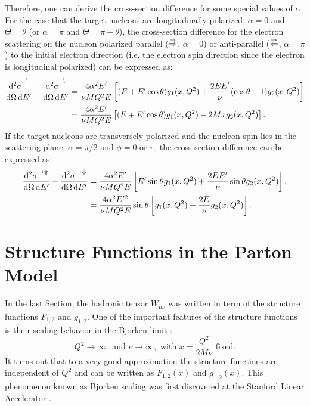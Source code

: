 Therefore, one can derive the cross-section difference for some special values of $\alpha$. For the case that the target nucleons are longitudinally polarized, $\alpha=0$ and $\Theta=\theta$ (or $\alpha=\pi$ and $\Theta=\pi-\theta$), the cross-section difference for the electron scattering on the nucleon polarized parallel ($\buildrel\rightarrow\over\Rightarrow$, $\alpha=0$) or anti-parallel ($\buildrel\rightarrow\over\Leftarrow$, $\alpha=\pi$) to the initial electron direction (i.e. the electron spin direction since the electron is longitudinal polarized) can be expressed as:
\begin{align}
\frac{\dd[2]{\sigma}^{\buildrel\rightarrow\over\Leftarrow}}{\dd{\Omega}\dd{E'}}-\frac{\dd[2]{\sigma}^{\buildrel\rightarrow\over\Rightarrow}}{\dd{\Omega}\dd{E'}} & = \frac{4\alpha^2E'}{\nu MQ^2E}\left[(E+E'\cos\theta)g_1(x,Q^2)+\frac{2EE'}{\nu}(\cos\theta-1)g_2(x,Q^2)\right] \notag \\ \label{C2S2E25}
& =\frac{4\alpha^2E'}{\nu MQ^2E}\left[(E+E'\cos\theta)g_1(x,Q^2)-2Mxg_2(x,Q^2)\right].
\end{align}
If the target nucleons are transversely polarized and the nucleon spin lies in the scattering plane, $\alpha=\pi/2$ and $\phi=0$ or $\pi$, the cross-section difference can be expressed as:
\begin{align}
\frac{\dd[2]{\sigma}^{\rightarrow\Uparrow}}{\dd{\Omega}\dd{E'}}-\frac{\dd[2]{\sigma}^{\rightarrow\Downarrow}}{\dd{\Omega}\dd{E'}} & = \frac{4\alpha^2E'}{\nu MQ^2E}\left[E'\sin\theta g_1(x,Q^2)+\frac{2EE'}{\nu}\sin\theta g_2(x,Q^2)\right]. \notag \\ \label{C2S2E26}
& = \frac{4\alpha^2E'^2}{\nu MQ^2E}\sin\theta\left[g_1(x,Q^2)+\frac{2E}{\nu}g_2(x,Q^2)\right].
\end{align}

\section{Structure Functions in the Parton Model}
\label{C2S3}

In the last Section, the hadronic tensor $W_{\mu\nu}$ was written in term of the structure functions $F_{1,2}$ and $g_{1,2}$. One of the important features of the structure functions is their scaling behavior in the Bjorken limit \cite{Bjorken1969}:
\begin{equation} \label{C2S3E1}
Q^2\to\infty, \text{ and } \nu\to\infty, \text{ with } x=\frac{Q^2}{2M\nu} \text{ fixed}.
\end{equation}
It turns out that to a very good approximation the structure functions are independent of $Q^2$ and can be written as $F_{1,2}(x)$ and $g_{1,2}(x)$. This phenomenon known as Bjorken scaling was first discovered at the Stanford Linear Accelerator \cite{Kendall1991}.

